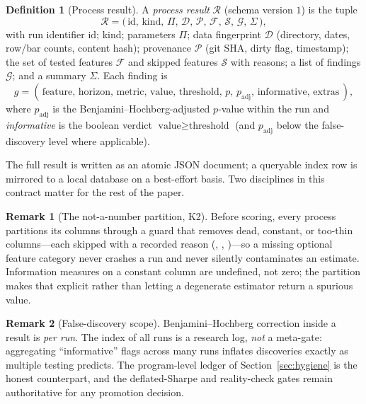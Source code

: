 \documentclass[11pt,a4paper]{article}
\theoremstyle{definition}
\newtheorem{definition}{Definition}[section]
\newtheorem{remark}{Remark}[section]
\theoremstyle{plain}
\newcommand{\code}[1]{\texttt{\detokenize{#1}}}
\begin{document}
\begin{definition}[Process result]
A \emph{process result} $\mathcal{R}$ (schema version $1$) is the tuple
\[
   \mathcal{R} = \big(\, \mathrm{id},\, \mathrm{kind},\, \Pi,\, \mathcal{D},\, \mathcal{P},\,
   \mathcal{F},\, \mathcal{S},\, \mathcal{G},\, \Sigma \,\big),
\]
with run identifier $\mathrm{id}$; kind; parameters $\Pi$; data fingerprint $\mathcal{D}$ (directory,
dates, row/bar counts, content hash); provenance $\mathcal{P}$ (git SHA, dirty flag, timestamp); the
set of tested features $\mathcal{F}$ and skipped features $\mathcal{S}$ with reasons; a list of
findings $\mathcal{G}$; and a summary $\Sigma$. Each finding is
\[
   g = (\,\text{feature},\, \text{horizon},\, \text{metric},\, \text{value},\, \text{threshold},\,
   p,\, p_{\mathrm{adj}},\, \text{informative},\, \text{extras}\,),
\]
where $p_{\mathrm{adj}}$ is the Benjamini--Hochberg-adjusted $p$-value within the run and
\emph{informative} is the boolean verdict $\text{value} \ge \text{threshold}$ (and $p_{\mathrm{adj}}$
below the false-discovery level where applicable).
\end{definition}

The full result is written as an atomic JSON document; a queryable index row is mirrored to a local
database on a best-effort basis. Two disciplines in this contract matter for the rest of the paper.

\begin{remark}[The not-a-number partition, K2]
Before scoring, every process partitions its columns through a guard that removes dead, constant, or
too-thin columns---each skipped with a recorded reason (\code{all_nan}, \code{constant},
\code{n_valid<min})---so a missing optional feature category never crashes a run and never silently
contaminates an estimate. Information measures on a constant column are undefined, not zero; the
partition makes that explicit rather than letting a degenerate estimator return a spurious value.
\end{remark}

\begin{remark}[False-discovery scope]
\label{rem:fdr-scope}
Benjamini--Hochberg correction inside a result is \emph{per run}. The index of all runs is a
research log, \emph{not} a meta-gate: aggregating ``informative'' flags across many runs inflates
discoveries exactly as multiple testing predicts. The program-level ledger of
Section~\ref{sec:hygiene} is the honest counterpart, and the deflated-Sharpe and reality-check
gates remain authoritative for any promotion decision.
\end{remark}
\end{document}
